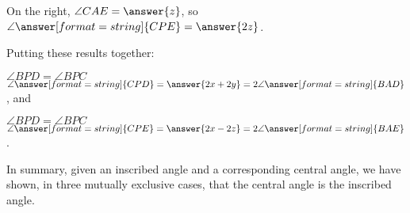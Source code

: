 \documentclass[handout,nooutcomes]{ximera}
\begin{document}
\begin{problem}
\begin{problem}
\begin{problem}
On the right, $\angle CAE = \answer{z}$, so $\angle \answer[format=string]{CPE} = \answer{2z}$.  

Putting these results together:

 $\angle BPD = \angle BPC$ \wordChoice{\choice[correct]{$+$}\choice{$-$}\choice{$\times$}\choice{$\div$}}$ \angle \answer[format=string]{CPD} 
 = \answer{2x + 2y} = 2 \angle \answer[format=string]{BAD}$, and 

 $\angle BPD = \angle BPC$ \wordChoice{\choice{$+$}\choice[correct]{$-$}\choice{$\times$}\choice{$\div$}} $\angle \answer[format=string]{CPE} 
 = \answer{2x - 2z} = 2 \angle \answer[format=string]{BAE}$.  

In summary, given an inscribed angle and a corresponding central angle, we have shown, in three mutually exclusive cases, that the central angle is 
 the inscribed angle.  

\end{problem}
\end{problem}
 

\end{problem}
\end{document}
